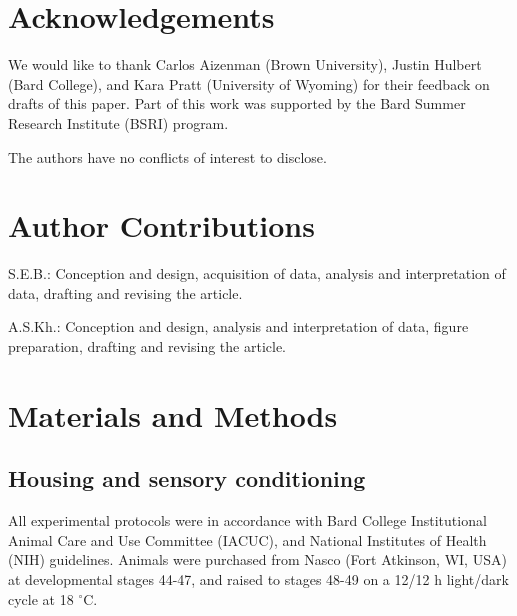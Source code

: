 \documentclass{article}
\begin{document}

\section*{Acknowledgements}

We would like to thank Carlos Aizenman (Brown University), Justin Hulbert (Bard College), and Kara Pratt (University of Wyoming) for their feedback on drafts of this paper. Part of this work was supported by the Bard Summer Research Institute (BSRI) program.


The authors have no conflicts of interest to disclose.

\section*{Author Contributions}

S.E.B.: Conception and design, acquisition of data, analysis and interpretation of data, drafting and revising the article. 

A.S.Kh.: Conception and design, analysis and interpretation of data, figure preparation, drafting and revising the article.

\section*{Materials and Methods}

\subsection*{Housing and sensory conditioning}

All experimental protocols were in accordance with Bard College Institutional Animal Care and Use Committee (IACUC), and National Institutes of Health (NIH) guidelines. Animals were purchased from Nasco (Fort Atkinson, WI, USA) at developmental stages 44-47, and raised to stages 48-49 on a 12/12 h light/dark cycle at 18 $^{\circ}$C. 
\end{document}
